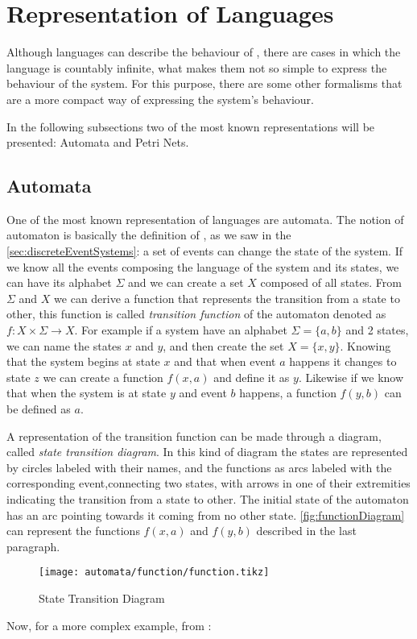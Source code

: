 \section{Representation of Languages}
\label{sec:representationLanguages}

Although languages can describe the behaviour of \DESs, there are cases in which the language is countably infinite, what makes them not so simple to express the
behaviour of the system. For this purpose, there are some other formalisms that
are a more compact way of expressing the
system's behaviour.

In the following subsections two of the most known representations will be
presented: Automata and Petri Nets.

\subsection{Automata}
\label{sec:automata}
One of the most known representation of languages are automata. The notion of
automaton is basically the definition of \DESs, as we saw in the
\autoref{sec:discreteEventSystems}: a set of events can change the state of the
system. If we know all the events composing the language of the
system and its states, we can have its alphabet $\Sigma$ and we can create a set $X$ composed
of all states.
From $\Sigma$ and $X$ we can derive a function that represents the transition
from a state to other, this function is called \emph{transition function} of the automaton
denoted as $f : X \times \Sigma \rightarrow X$. For example if a system have an
alphabet $\Sigma = \{a,b\}$ and 2 states, we can name the states $x$ and
$y$, and then create the set $X = \{x,y\}$. Knowing that the system begins at state $x$
and that when event $a$ happens it changes to state $z$ we can create a function
$f(x,a)$ and define it as $y$. Likewise if we know that when the system is at
state $y$ and event $b$ happens, a function $f(y,b)$ can be defined as $a$.

 A representation of the transition function can be made through a diagram, called \emph{state transition diagram}. In this kind of diagram the states are
represented by circles labeled with their names, and the functions as arcs
labeled with the corresponding event,connecting two states, with arrows in one of their
extremities indicating the transition from a state to other. The initial state
of the automaton has an arc pointing towards it coming from no other state.
\autoref{fig:functionDiagram} can represent the functions $f(x,a)$ and $f(y,b)$
described in the last paragraph.
\begin{figure}[H]
  \centering
  \texttt{[image: automata/function/function.tikz]}
  \caption{State Transition Diagram}
  \label{fig:functionDiagram}
\end{figure}
Now, for a more complex example, from \cite{cassandras2009introduction}:

